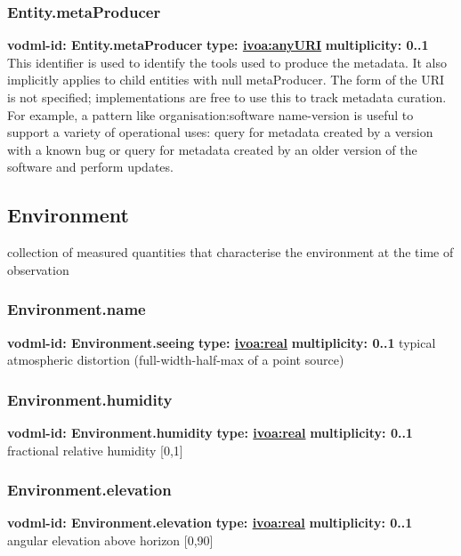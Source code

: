     \subsubsection{Entity.metaProducer}
      \textbf{vodml-id: Entity.metaProducer} \newline
      \textbf{type: \hyperref[sect:ivoa]{ivoa:anyURI}} \newline
      \textbf{multiplicity: 0..1} \newline
      This identifier is used to identify the tools used to produce the metadata. It also implicitly applies to child entities with null metaProducer. The form of the URI is not specified; implementations are free to use this to track metadata curation. For example, a pattern like {organisation}:{software name}-{version} is useful to support a variety of operational uses: query for metadata created by a version with a known bug or query for metadata created by an older version of the software and perform updates.

  \subsection{Environment}
  \label{sect:Environment}
    collection of measured quantities that characterise the environment at the time of observation

    \subsubsection{Environment.name}
      \textbf{vodml-id: Environment.seeing} \newline
      \textbf{type: \hyperref[sect:ivoa]{ivoa:real}} \newline
      \textbf{multiplicity: 0..1} \newline
      typical atmospheric distortion (full-width-half-max of a point source)

    \subsubsection{Environment.humidity}
      \textbf{vodml-id: Environment.humidity} \newline
      \textbf{type: \hyperref[sect:ivoa]{ivoa:real}} \newline
      \textbf{multiplicity: 0..1} \newline
      fractional relative humidity [0,1]

    \subsubsection{Environment.elevation}
      \textbf{vodml-id: Environment.elevation} \newline
      \textbf{type: \hyperref[sect:ivoa]{ivoa:real}} \newline
      \textbf{multiplicity: 0..1} \newline
      angular elevation above horizon [0,90]

